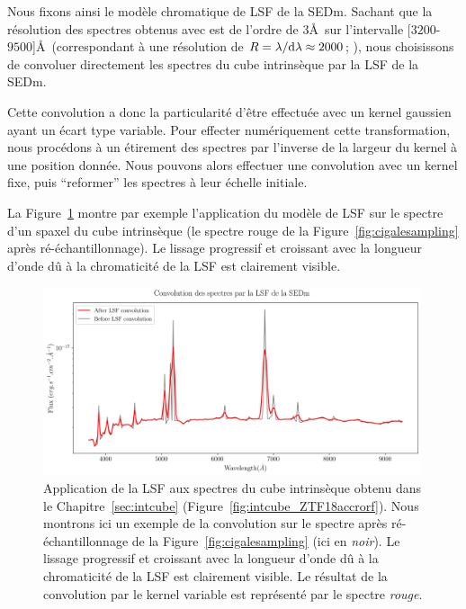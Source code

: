 \documentclass[../main/main.tex]{subfiles}
\begin{document}

Nous fixons ainsi le modèle chromatique de LSF de la SEDm. Sachant que la résolution
des spectres obtenus avec \cigale est de l'ordre de $3$\AA\ sur
l'intervalle [$3200$-$9500$]\AA\ (correspondant à une résolution de
$R=\lambda/\mathrm{d}\lambda\approx2000$; \citet{BCO3}), nous choisissons
de convoluer directement les spectres du cube intrinsèque par la LSF de
la SEDm.

Cette convolution a donc la particularité d'être effectuée avec un
kernel gaussien ayant un écart type variable. Pour effecter
numériquement cette
transformation, nous procédons à un
étirement des spectres par l'inverse de la largeur du kernel à une
position donnée. Nous pouvons alors effectuer une convolution avec un
kernel fixe, puis ``reformer'' les spectres à leur échelle initiale.

La Figure~\ref{fig:lsfapplied} montre par exemple l'application du
modèle de LSF sur le spectre d'un spaxel du cube intrinsèque (le spectre
rouge de la Figure~\ref{fig:cigalesampling} après
ré-échantillonnage). Le lissage progressif et croissant avec la
longueur d'onde dû à la chromaticité de la LSF est
clairement visible.

\begin{figure}[h!]
  \centering
  \includegraphics[width=0.99\textwidth]{../figures/06_irf/lsfapplied.png}
  \caption[Application de la LSF]{Application de la LSF aux spectres du
    cube intrinsèque obtenu dans le Chapitre~\ref{sec:intcube}
    (Figure~\ref{fig:intcube_ZTF18accrorf}). Nous montrons ici un exemple
    de la convolution sur le spectre après ré-échantillonnage de la
    Figure~\ref{fig:cigalesampling} (ici en \textit{noir}). Le lissage progressif et croissant avec la
longueur d'onde dû à la chromaticité de la LSF est
clairement visible. Le résultat de la convolution par le kernel variable
est représenté par le spectre \textit{rouge}.}
  \label{fig:lsfapplied}
\end{figure}
\end{document}
